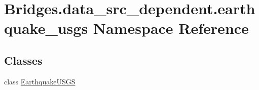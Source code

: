 \hypertarget{namespace_bridges_1_1data__src__dependent_1_1earthquake__usgs}{}\section{Bridges.\+data\+\_\+src\+\_\+dependent.\+earthquake\+\_\+usgs Namespace Reference}
\label{namespace_bridges_1_1data__src__dependent_1_1earthquake__usgs}
\subsection*{Classes}
\begin{DoxyCompactItemize}
\item 
class \hyperlink{class_bridges_1_1data__src__dependent_1_1earthquake__usgs_1_1_earthquake_u_s_g_s}{Earthquake\+U\+S\+G\+S}
\end{DoxyCompactItemize}
